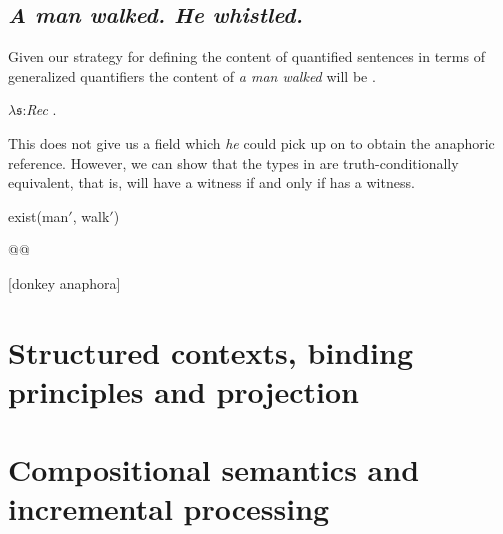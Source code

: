 \subsection{\textit{A man walked. He whistled.} }

Given our strategy for defining the content of quantified sentences in
terms of generalized quantifiers the content of \textit{a man walked}
will be \nexteg{}.
\begin{ex} 
$\lambda\mathfrak{s}$:\textit{Rec} .  
\end{ex} 
This does not give us a field which \textit{he} could pick up on to
obtain the anaphoric reference.  However, we can show that the types
in \nexteg{} are truth-conditionally equivalent, that is, 
will have a witness if and only if  has a witness.
\begin{ex} 
\begin{subex} 
 
\item exist(man$'$, walk$'$) 
 
\item {}
 
\end{subex} 
   
\end{ex} 
@@    
  

[donkey anaphora]

\section{Structured contexts, binding principles and projection}
\label{sec:struc-cntxt}

\section{Compositional semantics and incremental processing}

